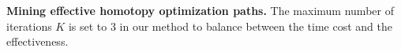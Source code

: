 

















\noindent\textbf{Mining effective homotopy optimization paths.} The maximum number of iterations $K$ is set to $3$ in our method to balance between the time cost and the effectiveness. 

